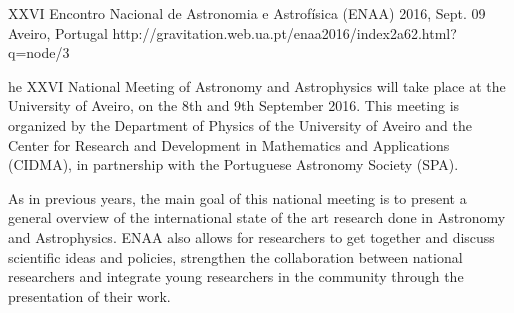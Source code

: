  {XXVI Encontro Nacional de Astronomia e Astrofísica (ENAA)}%
{2016, Sept. 09}%
{Aveiro, Portugal}%
{http://gravitation.web.ua.pt/enaa2016/index2a62.html?q=node/3}%
{}%
{he XXVI National Meeting of Astronomy and Astrophysics will take place at the University of Aveiro, on the 8th and 9th September 2016. This meeting is organized by the Department of Physics of the University of Aveiro and the Center for Research and Development in Mathematics and Applications (CIDMA), in partnership with the Portuguese Astronomy Society (SPA).
    
As in previous years, the main goal of this national meeting is to present a general overview of the international state of the art research done in Astronomy and Astrophysics. ENAA also allows for researchers to get together and discuss scientific ideas and policies, strengthen the collaboration between national researchers and integrate young researchers in the community through the presentation of their work.}
